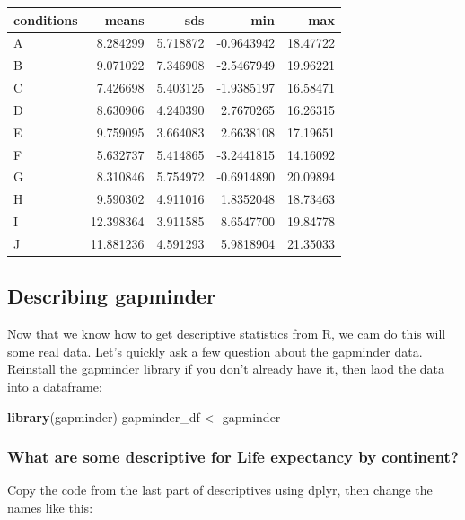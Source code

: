 \documentclass[]{book}
\newenvironment{Shaded}{\begin{snugshade}}{\end{snugshade}}
\newcommand{\KeywordTok}[1]{\textcolor[rgb]{0.13,0.29,0.53}{\textbf{{#1}}}}
\newcommand{\StringTok}[1]{\textcolor[rgb]{0.31,0.60,0.02}{{#1}}}
\newcommand{\NormalTok}[1]{{#1}}
\theoremstyle{definition}
\theoremstyle{definition}
\theoremstyle{definition}
\theoremstyle{remark}
\begin{document}
\begin{tabular}{l|r|r|r|r}
\hline
conditions & means & sds & min & max\\
\hline
A & 8.284299 & 5.718872 & -0.9643942 & 18.47722\\
\hline
B & 9.071022 & 7.346908 & -2.5467949 & 19.96221\\
\hline
C & 7.426698 & 5.403125 & -1.9385197 & 16.58471\\
\hline
D & 8.630906 & 4.240390 & 2.7670265 & 16.26315\\
\hline
E & 9.759095 & 3.664083 & 2.6638108 & 17.19651\\
\hline
F & 5.632737 & 5.414865 & -3.2441815 & 14.16092\\
\hline
G & 8.310846 & 5.754972 & -0.6914890 & 20.09894\\
\hline
H & 9.590302 & 4.911016 & 1.8352048 & 18.73463\\
\hline
I & 12.398364 & 3.911585 & 8.6547700 & 19.84778\\
\hline
J & 11.881236 & 4.591293 & 5.9818904 & 21.35033\\
\hline
\end{tabular}

\subsection{Describing gapminder}\label{describing-gapminder}

Now that we know how to get descriptive statistics from R, we cam do
this will some real data. Let's quickly ask a few question about the
gapminder data. Reinstall the gapminder library if you don't already
have it, then laod the data into a dataframe:

\begin{Shaded}
\begin{Highlighting}[]
\KeywordTok{library}\NormalTok{(gapminder)}
\NormalTok{gapminder_df <-}\StringTok{ }\NormalTok{gapminder}
\end{Highlighting}
\end{Shaded}

\subsubsection{What are some descriptive for Life expectancy by
continent?}\label{what-are-some-descriptive-for-life-expectancy-by-continent}

Copy the code from the last part of descriptives using dplyr, then
change the names like this:
\end{document}
